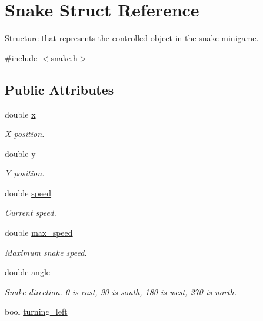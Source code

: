 \hypertarget{struct_snake}{}\section{Snake Struct Reference}
\label{struct_snake}


Structure that represents the controlled object in the snake minigame.  




{\ttfamily \#include $<$snake.\+h$>$}

\subsection*{Public Attributes}
\begin{DoxyCompactItemize}
\item 
double \mbox{\hyperlink{group__snake_ga785740f93d9f05bf6821595b78000b64}{x}}
\begin{DoxyCompactList}\small\item\em X position. \end{DoxyCompactList}\item 
double \mbox{\hyperlink{group__snake_gac2c669473500f0d409a6e809700f537d}{y}}
\begin{DoxyCompactList}\small\item\em Y position. \end{DoxyCompactList}\item 
double \mbox{\hyperlink{group__snake_ga203349d9342db170b9745c3da26dbcbe}{speed}}
\begin{DoxyCompactList}\small\item\em Current speed. \end{DoxyCompactList}\item 
double \mbox{\hyperlink{group__snake_ga52857dbba7b74ca5c06b9b872cc1fb67}{max\+\_\+speed}}
\begin{DoxyCompactList}\small\item\em Maximum snake speed. \end{DoxyCompactList}\item 
double \mbox{\hyperlink{group__snake_ga74c9d3c783fec83cb7efbdd228821fe7}{angle}}
\begin{DoxyCompactList}\small\item\em \mbox{\hyperlink{struct_snake}{Snake}} direction. 0 is east, 90 is south, 180 is west, 270 is north. \end{DoxyCompactList}\item 
bool \mbox{\hyperlink{group__snake_ga2c1982167b9cfb8ead89775dbef75be3}{turning\+\_\+left}}

\end{DoxyCompactItemize}
